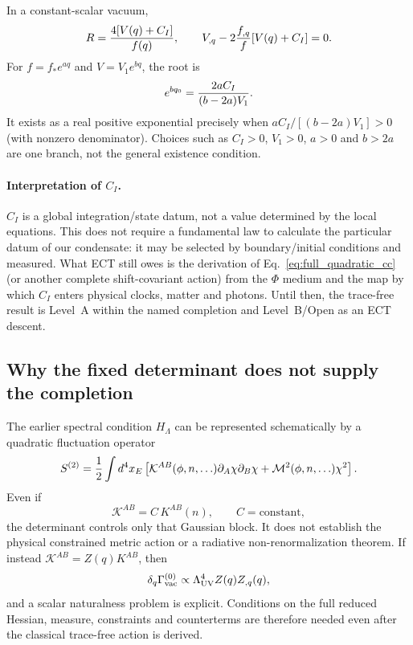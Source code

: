In a constant-scalar vacuum,
\begin{equation}
 R={4[V(q)+C_I]\over f(q)},\qquad
 V_{,q}-2{f_{,q}\over f}[V(q)+C_I]=0.
 \label{eq:H1_broken_correction}
\end{equation}
For $f=f_*e^{aq}$ and $V=V_1e^{bq}$, the root is
\begin{equation}
 e^{bq_0}={2aC_I\over(b-2a)V_1}.
 \label{eq:cc_tracefree_root}
\end{equation}
It exists as a real positive exponential precisely when
$aC_I/[(b-2a)V_1]>0$ (with nonzero denominator).  Choices such as
$C_I>0$, $V_1>0$, $a>0$ and $b>2a$ are one branch, not the general
existence condition.

\paragraph{Interpretation of $C_I$.}
$C_I$ is a global integration/state datum, not a value determined by the
local equations.  This does not require a fundamental law to calculate the
particular datum of our condensate: it may be selected by boundary/initial
conditions and measured.  What ECT still owes is the derivation of
Eq.~\eqref{eq:full_quadratic_cc} (or another complete shift-covariant action)
from the $\Phi$ medium and the map by which $C_I$ enters physical clocks,
matter and photons.  Until then, the trace-free result is Level~A within the
named completion and Level~B/Open as an ECT descent.

\subsection{Why the fixed determinant does not supply the completion}
\label{subsec:Hlambda_cc}

The earlier spectral condition $H_\Lambda$ can be represented schematically
by a quadratic fluctuation operator
\begin{equation}
 S^{(2)}={1\over2}\int d^4x_E\left[
 \mathcal K^{AB}(\phi,n,\ldots)\partial_A\chi\partial_B\chi
 +\mathcal M^2(\phi,n,\ldots)\chi^2\right].
 \label{eq:full_quadratic_cc_compat}
\end{equation}
Even if
\begin{equation}
 \mathcal K^{AB}=C\,K^{AB}(n),\qquad C=\text{constant},
 \label{eq:H1_cc_compat}
\end{equation}
the determinant controls only that Gaussian block.  It does not establish
the physical constrained metric action or a radiative
non-renormalization theorem.  If instead
$\mathcal K^{AB}=Z(q)K^{AB}$, then
\begin{equation}
 \delta_q\Gamma_{\rm vac}^{(0)}
 \propto\Lambda_{\rm UV}^4Z(q)Z_{,q}(q),
 \label{eq:H1_broken_correction_compat}
\end{equation}
and a scalar naturalness problem is explicit.  Conditions on the full
reduced Hessian, measure, constraints and counterterms are therefore needed
even after the classical trace-free action is derived.

